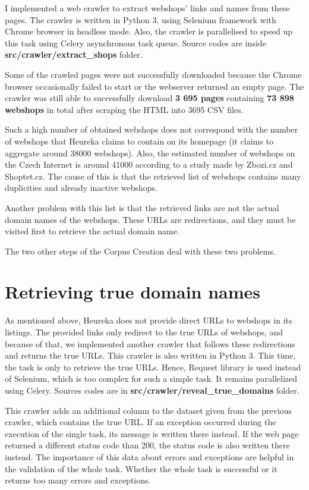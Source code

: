 I implemented a web crawler to extract webshops' links and names from these pages. The crawler is written in Python 3, using Selenium framework with Chrome browser in headless mode. Also, the crawler is parallelised to speed up this task using Celery asynchronous task queue. Source codes are inside \textbf{src\string/crawler\string/extract\_shops} folder. 

Some of the crawled pages were not successfully downloaded because the Chrome browser occasionally failed to start or the webserver returned an empty page. The crawler was still able to successfully download \textbf{3 695 pages} containing \textbf{73 898 webshops} in total after scraping the HTML into 3695 CSV files.

Such a high number of obtained webshops does not correspond with the number of webshops that Heureka claims to contain on its homepage (it claims to aggregate around 38000 webshops). Also, the estimated number of webshops on the Czech Internet is around 41000 according to a study made by Zbozi.cz and Shoptet.cz\cite{srovnavace-shoptet}. The cause of this is that the retrieved list of webshops contains many duplicities and already inactive webshops.

Another problem with this list is that the retrieved links are not the actual domain names of the webshops. These URLs are redirections, and they must be visited first to retrieve the actual domain name.

The two other steps of the Corpus Creation deal with these two problems.

\section{Retrieving true domain names}

As mentioned above, Heureka does not provide direct URLs to webshops in its listings. The provided links only redirect to the true URLs of webshops, and because of that, we implemented another crawler that follows these redirections and returns the true URLs. This crawler is also written in Python 3. This time, the task is only to retrieve the true URLs. Hence, Request library is used instead of Selenium, which is too complex for such a simple task. It remains parallelized using Celery. Sources codes are in \textbf{src\string/crawler\string/reveal\_true\_domains} folder.

This crawler adds an additional column to the dataset given from the previous crawler, which contains the true URL. If an exception occurred during the execution of the single task, its message is written there instead. If the web page returned a different status code than 200, the status code is also written there instead. The importance of this data about errors and exceptions are helpful in the validation of the whole task. Whether the whole task is successful or it returns too many errors and exceptions.

